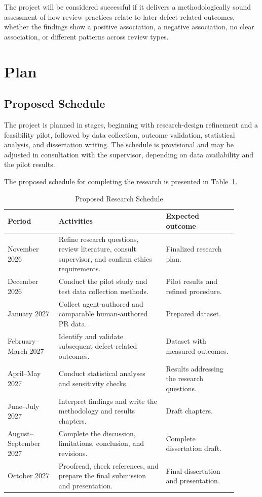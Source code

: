 \documentclass[stu,12pt,donotrepeattitle]{apa7}
\begin{document}
The project will be considered successful if it delivers a methodologically sound assessment of how review practices relate to later defect-related outcomes, whether the findings show a positive association, a negative association, no clear association, or different patterns across review types.

\section{Plan}

\subsection{Proposed Schedule}

The project is planned in stages, beginning with research-design refinement and a feasibility pilot, followed by data collection, outcome validation, statistical analysis, and dissertation writing. The schedule is provisional and may be adjusted in consultation with the supervisor, depending on data availability and the pilot results.

The proposed schedule for completing the research is presented in Table~\ref{tab:schedule}.

\begin{table}[ht]
\caption{Proposed Research Schedule}
\label{tab:schedule}
\small
\begin{tabular}{@{}>{\raggedright\arraybackslash}p{0.2\linewidth}>{\raggedright\arraybackslash}p{0.42\linewidth}>{\raggedright\arraybackslash}p{0.28\linewidth}@{}}
\toprule
Period & Activities & Expected outcome \\
\midrule
November 2026 & Refine research questions, review literature, consult supervisor, and confirm ethics requirements. & Finalized research plan. \\
December 2026 & Conduct the pilot study and test data collection methods. & Pilot results and refined procedure. \\
January 2027 & Collect agent-authored and comparable human-authored PR data. & Prepared dataset. \\
February--March 2027 & Identify and validate subsequent defect-related outcomes. & Dataset with measured outcomes. \\
April--May 2027 & Conduct statistical analyses and sensitivity checks. & Results addressing the research questions. \\
June--July 2027 & Interpret findings and write the methodology and results chapters. & Draft chapters. \\
August--September 2027 & Complete the discussion, limitations, conclusion, and revisions. & Complete dissertation draft. \\
October 2027 & Proofread, check references, and prepare the final submission and presentation. & Final dissertation and presentation. \\
\bottomrule
\end{tabular}
\end{table}
\end{document}

